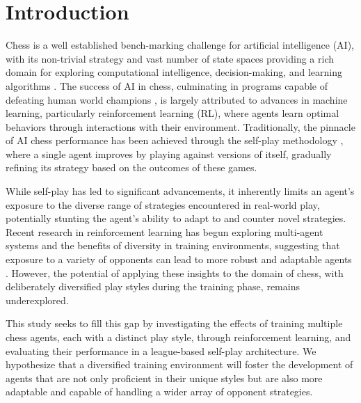 \documentclass[journal]{IEEEtran}
\begin{document}
	\section{Introduction}
	\label{sec:introduction}
	Chess is a well established bench-marking challenge for artificial intelligence (AI),
	with its non-trivial strategy and vast number of state spaces providing a rich domain for exploring 
	computational intelligence, decision-making, and learning algorithms 
	\cite{silver2017, silver2017a, schrittwieser2020, 
	campbell2002, lai2015, hammersborg2023,bertram2022}.
	The success of AI in chess, culminating in programs capable of defeating human world champions
	\cite{campbell2002}, 
	is largely attributed to advances in machine learning, particularly reinforcement learning (RL), 
	where agents learn optimal behaviors through interactions with their environment. 
	Traditionally, the pinnacle of AI chess performance has been achieved through the self-play methodology
	\cite{silver2017, silver2017a}, 
	where a single agent improves by playing against versions of itself, gradually refining its strategy based on the outcomes of these games.
	
	While self-play has led to significant advancements, it inherently limits an agent's exposure to the diverse range of strategies 
	encountered in real-world play, potentially stunting the agent's ability to adapt to and counter novel strategies. 
	Recent research in reinforcement learning has begun exploring multi-agent systems and the benefits of diversity in training environments, 
	suggesting that exposure to a variety of opponents can lead to more robust and adaptable agents
	\cite{}. 
	However, the potential of applying these insights to the domain of chess, 
	with deliberately diversified play styles during the training phase, remains underexplored.
	\begin{comment}
		I don't love this sentence, I think it implies too much that this is about chess in particular
	\end{comment}
	
	This study seeks to fill this gap by investigating the effects of training multiple chess agents, each with a distinct play style, 
	through reinforcement learning, and evaluating their performance in a league-based self-play architecture. 
	We hypothesize that a diversified training environment will foster the development of agents that are not only 
	proficient in their unique styles but are also more adaptable and capable of handling a wider array of opponent strategies. 
	
\end{document}
